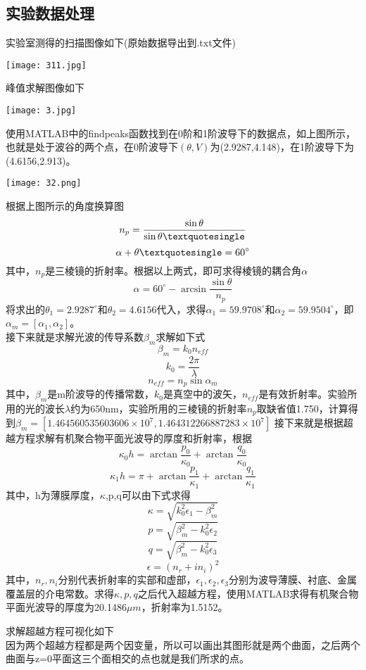 \documentclass{zjureport}
\begin{document}
	\subsection{实验数据处理}
	\begin{clause}
		\item 实验室测得的扫描图像如下(原始数据导出到.txt文件)
		\begin{center}
			\texttt{[image: 311.jpg]}
		\end{center}
	\item 峰值求解图像如下
	\begin{center}
		\texttt{[image: 3.jpg]}
	\end{center}
	使用MATLAB中的findpeaks函数找到在0阶和1阶波导下的数据点，如上图所示，也就是处于波谷的两个点，在0阶波导下$(\theta,V)$为(2.9287,4.148)，在1阶波导下为(4.6156,2.913)。
	\begin{center}
		\texttt{[image: 32.png]}
	\end{center}
	根据上图所示的角度换算图
	$$n_{p}=\frac{\sin \theta}{\sin \theta\textquotesingle}$$
	$$\alpha+\theta\textquotesingle=60^{\circ}$$
	其中，$n_{p}$是三棱镜的折射率。根据以上两式，即可求得棱镜的耦合角$\alpha$
	$$\alpha=60^{\circ}-\arcsin\frac{\sin\theta}{n_{p}}$$
	将求出的$\theta_{1}=2.9287^{\circ}$和$\theta_{2}=4.6156$代入，求得$\alpha_{1}=59.9708^{\circ}$和$\alpha_{2}=59.9504^{\circ}$，即$\alpha_{m}=[\alpha_{1},\alpha_{2}]$。\\
	接下来就是求解光波的传导系数$\beta_{m}$求解如下式
	$$\beta_{m}=k_{0}n_{eff}$$
	$$k_{0}=\frac{2\pi}{\lambda}$$
	$$n_{eff}=n_{p}\sin\alpha_{m}$$
	其中，$\beta_{m}$是m阶波导的传播常数，$k_{0}$是真空中的波矢，$n_{eff}$是有效折射率。实验所用的光的波长$\lambda$约为650nm，实验所用的三棱镜的折射率$n_{p}$取缺省值1.750，计算得到$\beta_{m}=[1.464560535603606\times10^{7},1.464312266887283\times10^{7}]$
	接下来就是根据超越方程求解有机聚合物平面光波导的厚度和折射率，根据
	$$\kappa_{0}h=\arctan\frac{p_{0}}{\kappa_{0}}+\arctan\frac{q_{0}}{\kappa_{0}}$$
	$$\kappa_{1}h=\pi+\arctan\frac{p_{1}}{\kappa_{1}}+\arctan\frac{q_{1}}{\kappa_{1}}$$
	其中，h为薄膜厚度，$\kappa$,p,q可以由下式求得
	$$\kappa=\sqrt{k_{0}^{2}\epsilon_{1}-\beta_{m}^{2}}$$
	$$p=\sqrt{\beta_{m}^{2}-k_{0}^{2}\epsilon_{2}}$$
	$$q=\sqrt{\beta_{m}^{2}-k^{2}_{0}\epsilon_{3}}$$
	$$\epsilon=(n_{r}+in_{i})^{2}$$
	其中，$n_{r},n_{i}$分别代表折射率的实部和虚部，$\epsilon_{1},\epsilon_{2},\epsilon_{3}$分别为波导薄膜、衬底、金属覆盖层的介电常数。求得$\kappa,p,q$之后代入超越方程，使用MATLAB求得有机聚合物平面光波导的厚度为20.1486$\mu m$，折射率为1.5152。
		\item 求解超越方程可视化如下\\
		因为两个超越方程都是两个因变量，所以可以画出其图形就是两个曲面，之后两个曲面与z=0平面这三个面相交的点也就是我们所求的点。
		\begin{center}
		\end{center}
	

\end{clause}
\end{document}
